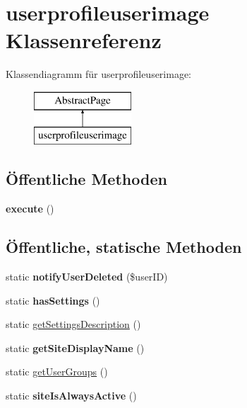 \hypertarget{classuserprofileuserimage}{}\section{userprofileuserimage Klassenreferenz}
\label{classuserprofileuserimage}
Klassendiagramm für userprofileuserimage\+:\begin{figure}[H]
\begin{center}
\leavevmode
\includegraphics[height=2.000000cm]{classuserprofileuserimage}
\end{center}
\end{figure}
\subsection*{Öffentliche Methoden}
\begin{DoxyCompactItemize}
\item 
\mbox{\label{classuserprofileuserimage_a9498bb27cf708efcec0155d95a57a85d}} 
{\bfseries execute} ()
\end{DoxyCompactItemize}
\subsection*{Öffentliche, statische Methoden}
\begin{DoxyCompactItemize}
\item 
\mbox{\label{classuserprofileuserimage_a8cc77b6703dcfea94cdf8b451ae40592}} 
static {\bfseries notify\+User\+Deleted} (\$user\+ID)
\item 
\mbox{\label{classuserprofileuserimage_a4ee755e8ca323883a349ff855d3f204f}} 
static {\bfseries has\+Settings} ()
\item 
static \mbox{\hyperlink{classuserprofileuserimage_aa5c8eadea0a2ad16a471d96e265d0d39}{get\+Settings\+Description}} ()
\item 
\mbox{\label{classuserprofileuserimage_a7b8b2e7e56852e0cdd35dc5a56bf3c1c}} 
static {\bfseries get\+Site\+Display\+Name} ()
\item 
static \mbox{\hyperlink{classuserprofileuserimage_af230bfd3cb88ca421bb7fb94946c1c4f}{get\+User\+Groups}} ()
\item 
\mbox{\label{classuserprofileuserimage_a119cd29b3612b732b0d342286e30d696}} 
static {\bfseries site\+Is\+Always\+Active} ()
\end{DoxyCompactItemize}
